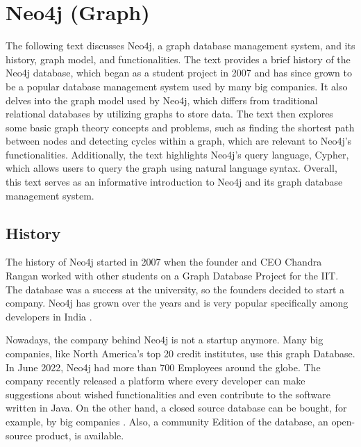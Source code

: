 
\chapter{Neo4j (Graph)} \label{ch:neo4j}

The following text discusses Neo4j, a graph database management system, and its history, graph model, and functionalities. The text provides a brief history of the Neo4j database, which began as a student project in 2007 and has since grown to be a popular database management system used by many big companies. It also delves into the graph model used by Neo4j, which differs from traditional relational databases by utilizing graphs to store data. The text then explores some basic graph theory concepts and problems, such as finding the shortest path between nodes and detecting cycles within a graph, which are relevant to Neo4j's functionalities. Additionally, the text highlights Neo4j's query language, Cypher, which allows users to query the graph using natural language syntax. Overall, this text serves as an informative introduction to Neo4j and its graph database management system.

\section{History} \label{sec:historyNeo4j}

The history of Neo4j started in 2007 when the founder and CEO Chandra Rangan worked with other students on a Graph Database Project for the \ac{IIT}. The database was a success at the university, so the founders
decided to start a company. Neo4j has grown over the years and is very popular specifically among developers in India \parencite{historyneo4j}.

Nowadays, the company behind Neo4j is not a startup anymore. Many big companies, like North America's top 20 credit institutes, use this graph Database. In June 2022, Neo4j had more than 700 Employees around the globe.
The company recently released a platform where every developer can make suggestions about wished functionalities and even contribute
to the software written in Java. On the other hand, a closed source database can be bought, for example, by big companies \parencite{historyneo4j}. Also, a community Edition of the database, an open-source product, is available.

